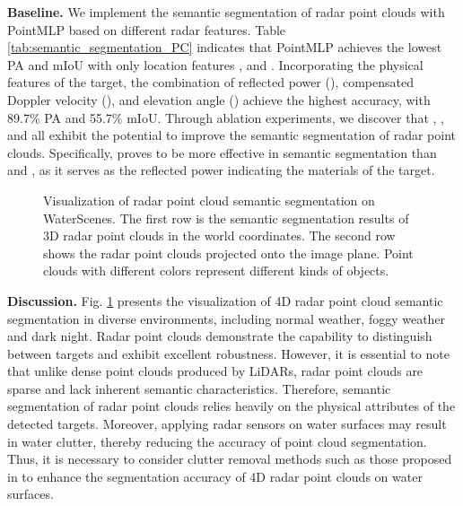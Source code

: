 \documentclass[lettersize,journal]{IEEEtran}
\begin{document}
\textbf{Baseline.} We implement the semantic segmentation of radar point clouds with PointMLP based on different radar features. Table \ref{tab:semantic_segmentation_PC} indicates that PointMLP achieves the lowest PA and mIoU with only location features ,  and . 
Incorporating the physical features of the target, the combination of reflected power (), compensated Doppler velocity (), and elevation angle () achieve the highest accuracy, with 89.7\% PA and 55.7\% mIoU. 
Through ablation experiments, we discover that , , and  all exhibit the potential to improve the semantic segmentation of radar point clouds.
Specifically,  proves to be more effective in semantic segmentation than  and , as it serves as the reflected power indicating the materials of the target.




\begin{figure}[htbp]
\centering
{}
\quad
\hspace{-7mm}
\quad
\hspace{-7mm}
\vspace{-2mm}
\centering

\quad
\hspace{-6.8mm}
\quad
\hspace{-6.8mm}
\caption{Visualization of radar point cloud semantic segmentation on WaterScenes. The first row is the semantic segmentation results of 3D radar point clouds in the world coordinates. The second row shows the radar point clouds projected onto the image plane. Point clouds with different colors represent different kinds of objects.}
\label{fig:radar-pc-seg}
\end{figure}

\textbf{Discussion.} Fig. \ref{fig:radar-pc-seg} presents the visualization of 4D radar point cloud semantic segmentation in diverse environments, including normal weather, foggy weather and dark night. Radar point clouds demonstrate the capability to distinguish between targets and exhibit excellent robustness.
However, it is essential to note that unlike dense point clouds produced by LiDARs, radar point clouds are sparse and lack inherent semantic characteristics. Therefore, semantic segmentation of radar point clouds relies heavily on the physical attributes of the detected targets. 
Moreover, applying radar sensors on water surfaces may result in water clutter, thereby reducing the accuracy of point cloud segmentation. Thus, it is necessary to consider clutter removal methods such as those proposed in \cite{cheng2021new, cheng2021person} to enhance the segmentation accuracy of 4D radar point clouds on water surfaces.
\end{document}
